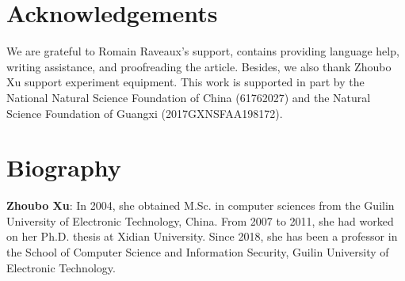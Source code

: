 \documentclass[times,onecolumn,final,authoryear]{article}
\theoremstyle{definition}
\begin{document}



\section*{Acknowledgements}
We are grateful to Romain Raveaux's support, contains providing language help, writing assistance, and proofreading the article. Besides, we also thank Zhoubo Xu support experiment equipment. This work is supported in part by the National Natural Science Foundation of China (61762027) and the Natural Science Foundation of Guangxi (2017GXNSFAA198172).







\section*{Biography}
\textbf{Zhoubo Xu}:  In 2004, she obtained M.Sc. in computer sciences from the Guilin University of Electronic Technology, China. From 2007 to 2011, she had worked on her Ph.D. thesis at Xidian University. Since 2018, she has been a professor in the School of Computer Science and Information Security, Guilin University of Electronic Technology.
\end{document}

